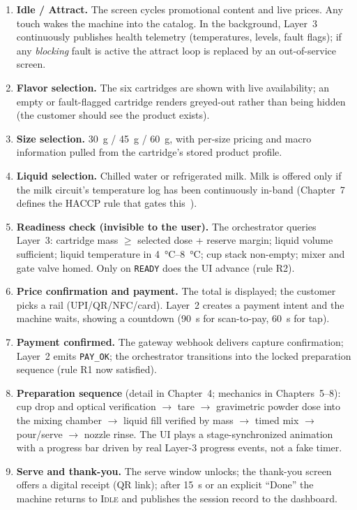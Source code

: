 \begin{enumerate}[label=\textbf{W\arabic*.}, itemsep=2pt]
  \item \textbf{Idle / Attract.} The screen cycles promotional content and
        live prices. Any touch wakes the machine into the catalog. In the
        background, Layer~3 continuously publishes health telemetry
        (temperatures, levels, fault flags); if any \emph{blocking} fault is
        active the attract loop is replaced by an out-of-service screen.
  \item \textbf{Flavor selection.} The six cartridges are shown with live
        availability; an empty or fault-flagged cartridge renders greyed-out
        rather than being hidden (the customer should see the product exists).
  \item \textbf{Size selection.} \SI{30}{\gram} / \SI{45}{\gram} /
        \SI{60}{\gram}, with per-size pricing and macro information pulled
        from the cartridge's stored product profile.
  \item \textbf{Liquid selection.} Chilled water or refrigerated milk.
        Milk is offered only if the milk circuit's temperature log has been
        continuously in-band (Chapter~7 defines the HACCP rule that gates
        this~\cite{codexhaccp}).
  \item \textbf{Readiness check (invisible to the user).} The orchestrator
        queries Layer~3: cartridge mass $\ge$ selected dose + reserve
        margin; liquid volume sufficient; liquid temperature in
        \SIrange{4}{8}{\celsius}; cup stack non-empty; mixer and gate valve
        homed. Only on \texttt{READY} does the UI advance (rule R2).
  \item \textbf{Price confirmation and payment.} The total is displayed;
        the customer picks a rail (UPI/QR/NFC/card). Layer~2 creates a
        payment intent and the machine waits, showing a countdown
        (\SI{90}{\second} for scan-to-pay, \SI{60}{\second} for tap).
  \item \textbf{Payment confirmed.} The gateway webhook delivers capture
        confirmation; Layer~2 emits \texttt{PAY\_OK}; the orchestrator
        transitions into the locked preparation sequence (rule R1 now
        satisfied).
  \item \textbf{Preparation sequence} (detail in Chapter~4; mechanics in
        Chapters~5--8): cup drop and optical verification $\rightarrow$
        tare $\rightarrow$ gravimetric powder dose into the mixing chamber
        $\rightarrow$ liquid fill verified by mass $\rightarrow$ timed mix
        $\rightarrow$ pour/serve $\rightarrow$ nozzle rinse. The UI plays a
        stage-synchronized animation with a progress bar driven by real
        Layer-3 progress events, not a fake timer.
  \item \textbf{Serve and thank-you.} The serve window unlocks; the
        thank-you screen offers a digital receipt (QR link); after
        \SI{15}{\second} or an explicit ``Done'' the machine returns to
        \textsc{Idle} and publishes the session record to the dashboard.
\end{enumerate}

